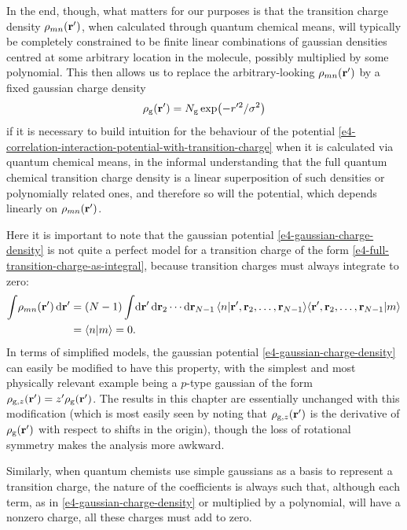 In the end, though, what matters for our purposes is that the transition charge density $\rho_{mn}(\vb{r}')$, when calculated through quantum chemical means, will typically be completely constrained to be finite linear combinations of gaussian densities centred at some arbitrary location in the molecule, possibly multiplied by some polynomial. This then allows us to replace the arbitrary-looking $\rho_{mn}(\vb{r}')$ by a fixed gaussian charge density
\begin{equation}
\rho_\mathrm{g}(\vb{r}')=N_\mathrm{g} \exp(-r'^2/\sigma^2)
\label{e4-gaussian-charge-density}
\end{equation}
if it is necessary to build intuition for the behaviour of the potential \eqref{e4-correlation-interaction-potential-with-transition-charge} when it is calculated via quantum chemical means, in the informal understanding that the full quantum chemical transition charge density is a linear superposition of such densities or polynomially related ones, and therefore so will the potential, which depends linearly on $\rho_{mn}(\vb{r}')$.


Here it is important to note that the gaussian potential \eqref{e4-gaussian-charge-density} is not quite a perfect model for a transition charge of the form \eqref{e4-full-transition-charge-as-integral}, because transition charges must always integrate to zero:
\begin{align}
\int \!
\rho_{mn}(\vb{r}')
\, \mathrm{d}\vb{r}'
& =
(N-1)
\int\!
\mathrm{d}\vb{r}' \,
\mathrm{d}\vb{r}_2 \cdots \mathrm{d}\vb{r}_{N-1} 
\braket{n}{\vb{r}',\vb{r}_2,\ldots,\vb{r}_{N-1}} \!
\braket{\vb{r}',\vb{r}_2,\ldots,\vb{r}_{N-1}}{m}
\nonumber \\ & =
\braket{n}{m}
= 0
.
\end{align}
In terms of simplified models, the gaussian potential \eqref{e4-gaussian-charge-density} can easily be modified to have this property, with the simplest and most physically relevant example being a $p$-type gaussian of the form $\rho_{\mathrm{g}, z} (\vb{r}')=z'\rho_\mathrm{g}(\vb{r}')$. The results in this chapter are essentially unchanged with this modification (which is most easily seen by noting that $\rho_{\mathrm{g}, z} (\vb{r}')$ is the derivative of $\rho_\mathrm{g}(\vb{r}')$ with respect to shifts in the origin), though the loss of rotational symmetry makes the analysis more awkward.

Similarly, when quantum chemists use simple gaussians as a basis to represent a transition charge, the nature of the coefficients is always such that, although each term, as in \eqref{e4-gaussian-charge-density} or multiplied by a polynomial, will have a nonzero charge, all these charges must add to zero.



